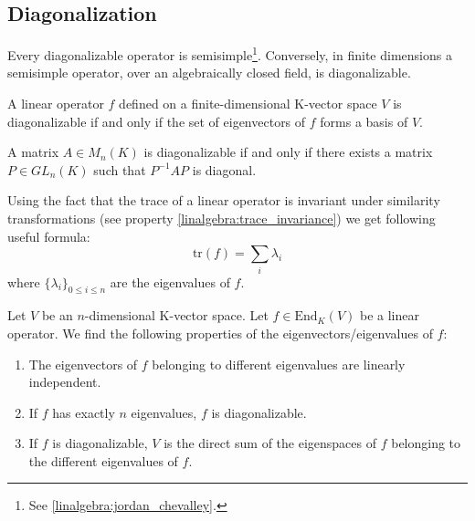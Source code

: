 \subsection{Diagonalization}

    	\begin{property}
    		Every diagonalizable operator is semisimple\footnote{See \ref{linalgebra:jordan_chevalley}.}. Conversely, in finite dimensions a semisimple operator, over an algebraically closed field, is diagonalizable.
    	\end{property}
    
    	\begin{theorem}\label{linalgebra:theorem:diagonalizable_basis}
	        A linear operator $f$ defined on a finite-dimensional K-vector space $V$ is diagonalizable if and only if the set of eigenvectors of $f$ forms a basis of $V$.
	\end{theorem}
		
        \begin{theorem}\label{linalgebra:theorem:diagonalizable_PQP}
		A matrix $A\in M_n(K)$ is diagonalizable if and only if there exists a matrix $P\in GL_n(K)$ such that $P^{-1}AP$ is diagonal.
        \end{theorem}
        \begin{result}
        	Using the fact that the trace of a linear operator is invariant under similarity transformations (see property \ref{linalgebra:trace_invariance}) we get following useful formula:
            	\begin{equation}
            		\boxed{\text{tr}(f) = \sum_i\lambda_i}
	        \end{equation}
            	where $\{\lambda_i\}_{0\leq i\leq n}$ are the eigenvalues of $f$.
        \end{result}
        
        \begin{property}\label{linalgebra:diagonalization_properties}
		Let $V$ be an $n$-dimensional K-vector space. Let $f\in \text{End}_K(V)$ be a linear operator. We find the following properties of the eigenvectors/eigenvalues of $f$:
            	\begin{enumerate}
			\item The eigenvectors of $f$ belonging to different eigenvalues are linearly independent.
                	\item If $f$ has exactly $n$ eigenvalues, $f$ is diagonalizable.
                	\item If $f$ is diagonalizable, $V$ is the direct sum of the eigenspaces of $f$ belonging to the different eigenvalues of $f$.
		\end{enumerate}
	\end{property}

